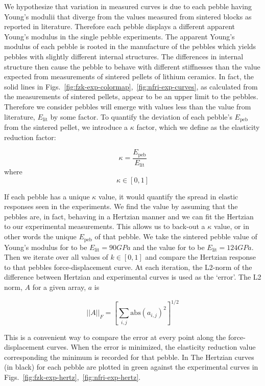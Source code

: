 We hypothesize that variation in measured curves is due to each pebble having Young's modulii that diverge from the values measured from sintered blocks as reported in literature. Therefore each pebble displays a different apparent Young's modulus in the single pebble experiments. The apparent Young's modulus of each pebble is rooted in the manufacture of the pebbles which yields pebbles with slightly different internal structures. The differences in internal structure then cause the pebble to behave with different stiffnesses than the value expected from measurements of sintered pellets of lithium ceramics. In fact, the solid lines in Figs.~\ref{fig:fzk-exp-colormap},~\ref{fig:nfri-exp-curves}, as calculated from the measurements of sintered pellets, appear to be an upper limit to the pebbles. Therefore we consider pebbles will emerge with values less than the value from literature, $E_\text{lit}$ by some factor. To quantify the deviation of each pebble's $E_\text{peb}$ from the sintered pellet, we introduce a $\kappa$ factor, which we define as the elasticity reduction factor:

\begin{equation}
\kappa = \frac{E_\text{peb}}{E_\text{lit}}
\end{equation}
where
\[
\kappa \in [0,1]
\]

If each pebble has a unique $\kappa$ value, it would quantify the spread in elastic responses seen in the experiments. We find the value by assuming that the pebbles are, in fact, behaving in a Hertzian manner and we can fit the Hertzian to our experimental measurements. This allows us to back-out a $\kappa$ value, or in other words the unique $E_\text{peb}$ of that pebble. We take the sintered pebble value of Young's modulus for \lis to be $E_\text{lit} = \si{90 GPa}$ and the value for \lit to be $E_\text{lit}= \si{124 GPa}$. Then we iterate over all values of $k\in[0,1]$ and compare the Hertzian response to that pebbles force-displacement curve. At each iteration, the L2-norm of the difference between Hertzian and experimental curves is used as the `error'. The L2 norm, $A$ for a given array, $a$ is 

\begin{equation}
||A||_F = \left[\sum_{i,j}\textrm{abs}(a_{i,j})^2\right]^{1/2}
\end{equation}

This is a convenient way to compare the error at every point along the force-displacement curves. When the error is minimized, the elasticity reduction value corresponding the minimum is recorded for that pebble. In The Hertzian curves (in black) for each pebble are plotted in green against the experimental curves in Figs.~\ref{fig:fzk-exp-hertz},~\ref{fig:nfri-exp-hertz}. 




